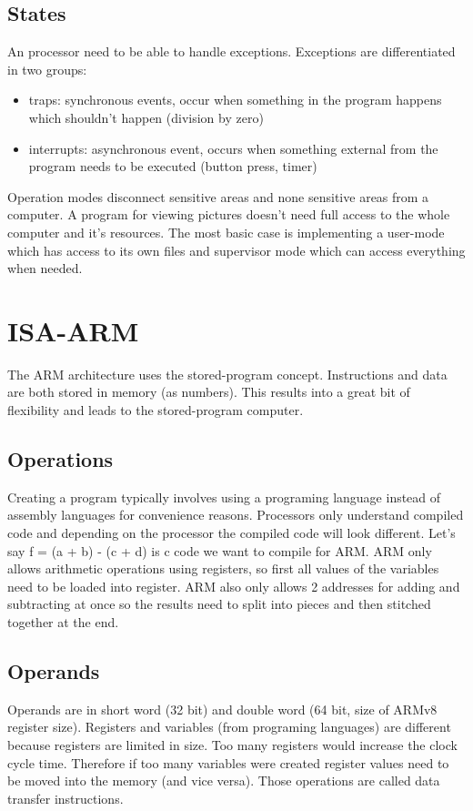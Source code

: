 \documentclass[a4paper]{scrartcl}
\begin{document}
        \subsection{States}
            An processor need to be able to handle exceptions. Exceptions are differentiated in two groups:
            \begin{itemize}
                \item traps: synchronous events, occur when something in the program happens which shouldn't happen (division by zero)
                \item interrupts: asynchronous event, occurs when something external from the program needs to be executed (button press, timer)
            \end{itemize}  
            Operation modes disconnect sensitive areas and none sensitive areas from a computer. A program for viewing pictures doesn't need full access to the whole
            computer and it's resources. The most basic case is implementing a user-mode which has access to its own files and supervisor mode which can access everything when needed.
            
    \section{ISA-ARM}
        The ARM architecture uses the stored-program concept. Instructions and data are both stored in memory (as numbers). This results into a great bit of flexibility and
        leads to the stored-program computer.
        \subsection{Operations}
            Creating a program typically involves using a programing language instead of assembly languages for convenience reasons. Processors only understand compiled code and
            depending on the processor the compiled code will look different. Let's say f = (a + b) - (c + d) is c code we want to compile for ARM. ARM only allows 
            arithmetic operations using registers, so first all values of the variables need to be loaded into register. ARM also only allows 2 addresses for adding and subtracting at once
            so the results need to split into pieces and then stitched together at the end. 
    
        \subsection{Operands}
            Operands are in short word (32 bit) and double word (64 bit, size of ARMv8 register size). Registers and variables (from programing languages) are different
            because registers are limited in size. Too many registers would increase the clock cycle time. %
            Therefore if too many variables were created register values need to be moved into the memory (and vice versa). Those operations are called data transfer instructions.
            
\end{document}
